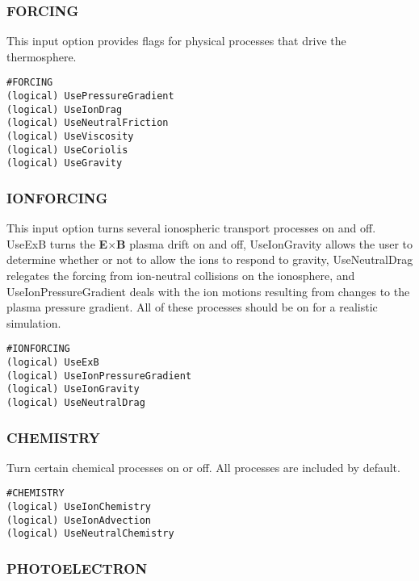 \subsubsection{FORCING}
\label{forcing.sec}

This input option provides flags for physical processes that drive the thermosphere.

\begin{verbatim}
#FORCING
(logical) UsePressureGradient 
(logical) UseIonDrag          
(logical) UseNeutralFriction  
(logical) UseViscosity        
(logical) UseCoriolis         
(logical) UseGravity        
\end{verbatim}

\subsubsection{IONFORCING}
\label{ionforcing.sec}

This input option turns several ionospheric transport processes on and off.  UseExB turns the {\bf E}$\times${\bf B} plasma drift on and off, UseIonGravity allows the user to determine whether or not to allow the ions to respond to gravity, UseNeutralDrag relegates the forcing from ion-neutral collisions on the ionosphere, and UseIonPressureGradient deals with the ion motions resulting from changes to the plasma pressure gradient.  All of these processes should be on for a realistic simulation.

\begin{verbatim}
#IONFORCING
(logical) UseExB           
(logical) UseIonPressureGradient
(logical) UseIonGravity     
(logical) UseNeutralDrag   
\end{verbatim}

\subsubsection{CHEMISTRY}

Turn certain chemical processes on or off.  All processes are included by default.

\begin{verbatim}
#CHEMISTRY
(logical) UseIonChemistry         
(logical) UseIonAdvection
(logical) UseNeutralChemistry
\end{verbatim}

\subsubsection{PHOTOELECTRON}
\label{photoelectron.sec}

